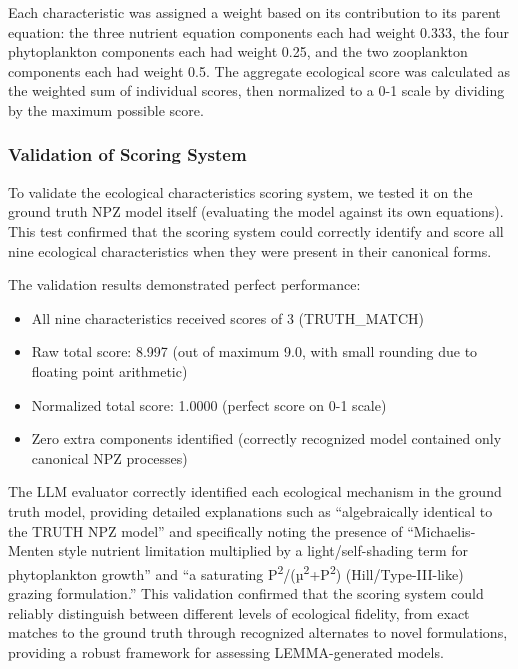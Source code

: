 Each characteristic was assigned a weight based on its contribution to its parent equation: the three nutrient equation components each had weight 0.333, the four phytoplankton components each had weight 0.25, and the two zooplankton components each had weight 0.5. The aggregate ecological score was calculated as the weighted sum of individual scores, then normalized to a 0-1 scale by dividing by the maximum possible score.

\subsubsection{Validation of Scoring System}

To validate the ecological characteristics scoring system, we tested it on the ground truth NPZ model itself (evaluating the model against its own equations). This test confirmed that the scoring system could correctly identify and score all nine ecological characteristics when they were present in their canonical forms.

The validation results demonstrated perfect performance:

\begin{itemize}
    \item All nine characteristics received scores of 3 (TRUTH\_MATCH)
    \item Raw total score: 8.997 (out of maximum 9.0, with small rounding due to floating point arithmetic)
    \item Normalized total score: 1.0000 (perfect score on 0-1 scale)
    \item Zero extra components identified (correctly recognized model contained only canonical NPZ processes)
\end{itemize}

The LLM evaluator correctly identified each ecological mechanism in the ground truth model, providing detailed explanations such as ``algebraically identical to the TRUTH NPZ model'' and specifically noting the presence of ``Michaelis-Menten style nutrient limitation multiplied by a light/self-shading term for phytoplankton growth'' and ``a saturating P\textsuperscript{2}/(µ\textsuperscript{2}+P\textsuperscript{2}) (Hill/Type-III-like) grazing formulation.'' This validation confirmed that the scoring system could reliably distinguish between different levels of ecological fidelity, from exact matches to the ground truth through recognized alternates to novel formulations, providing a robust framework for assessing LEMMA-generated models.

